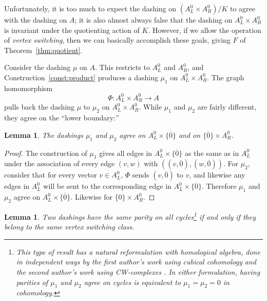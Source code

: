 \documentclass[12pt,twoside,singlespace]{article}
\numberwithin{equation}{section}
\newtheorem{lem}[equation]{Lemma}
\theoremstyle{definition}
\begin{document}
Unfortunately, it is too much to expect the dashing on $(A_L^0\times A_R^0)/K$ to agree with the dashing on $A$; it is also almost always false that the dashing on $A_L^0\times A_R^0$ is invariant under the quotienting action of $K$. However, if we allow the operation of \emph{vertex switching}, then we can basically accomplish these goals, giving $F$ of Theorem~\ref{thm:quotient}.






Consider the dashing $\mu$ on $A$.  This restricts to $A_L^0$ and $A_R^0$, and Construction~\ref{const:product} produces a dashing $\mu_1$ on $A_L^0\times A_R^0$.   The graph homomorphism
\[\Phi:A_L^0\times A_R^0\to A\]
pulls back the dashing $\mu$ to $\mu_2$ on $A_L^0\times A_R^0$. While $\mu_1$ and $\mu_2$ are fairly different, they agree on the ``lower boundary:''

\begin{lem}
\label{lem:agree-on-boundary}
The dashings $\mu_1$ and $\mu_2$ agree on $A_L^0\times \{\overline{0}\}$ and on $\{\overline{0}\}\times A_R^0$.
\end{lem}
\begin{proof}
The construction of $\mu_1$ gives all edges in $A_L^0\times\{\overline{0}\}$ as the same as in $A_L^0$ under the association of every edge $(v,w)$ with $((v,\overline{0}),(w,\overline{0}))$.  For $\mu_2$, consider that for every vector $v\in A_L^0$,  $\Phi$ sends $(v,\overline{0})$ to $v$, and likewise any edges in $A_L^0$ will be sent to the corresponding edge in $A_L^0\times\{\overline{0}\}$.  Therefore $\mu_1$ and $\mu_2$ agree on $A_L^0\times\{\overline{0}\}$.  Likewise for $\{0\}\times A_R^0$.
\end{proof}


\begin{lem}
\label{lem:cycles-switching-class}
Two dashings have the same parity on all cycles\footnote{This type of result has a natural reformulation with homological algebra, done in independent ways by the first author's work using cubical cohomology \cite{dil:cohomology} and the second author's work using CW-complexes \cite{zhang:adinkras}. In either formulation, having parities of $\mu_1$ and $\mu_2$ agree on cycles is equivalent to $\mu_1 = \mu_2 = 0$ in cohomology.} if and only if they belong to the same vertex switching class.
\end{lem}
\end{document}
